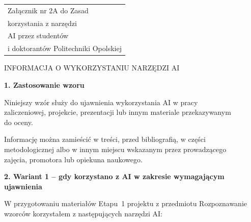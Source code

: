 \documentclass[12pt,a4paper]{article}
\begin{document}

\noindent\hfill
{\fontsize{11}{9}\selectfont\itshape
\begin{tabular}{@{}l@{}}
Załącznik nr 2A do Zasad\\
korzystania z narzędzi\\
AI przez studentów\\
i doktorantów Politechniki Opolskiej
\end{tabular}%
}


\begin{center}
INFORMACJA O WYKORZYSTANIU NARZĘDZI AI
\end{center}


\noindent\textbf{1. Zastosowanie wzoru}


\noindent Niniejszy wzór służy do ujawnienia wykorzystania AI w pracy\\
zaliczeniowej, projekcie, prezentacji lub innym materiale przekazywanym\\
do oceny.


\noindent Informację można zamieścić w treści, przed bibliografią, w części\\
metodologicznej albo w innym miejscu wskazanym przez prowadzącego\\
zajęcia, promotora lub opiekuna naukowego.


\noindent\textbf{2. Wariant 1 -- gdy korzystano z AI w zakresie wymagającym}\\
\textbf{ujawnienia}


\noindent W przygotowaniu materiałów Etapu~1 projektu z przedmiotu
Rozpoznawanie wzorców korzystałem z następujących narzędzi AI:

\end{document}
